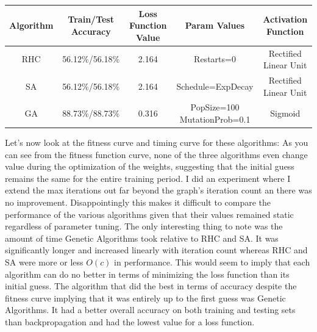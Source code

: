 \documentclass[11pt]{article}
\begin{document}
    \begin{center}
        \begin{tabular}{| c | c | c | c | c |}
            \hline
            Algorithm & Train/Test Accuracy & Loss Function Value & Param Values & Activation Function                 \\
            \hline
            \hline
            RHC       & 56.12\%/56.18\%      & 2.164              & Restarts=0   &        Rectified Linear Unit          \\
            \hline
            SA        & 56.12\%/56.18\%     & 2.164               & Schedule=ExpDecay &    Rectified Linear Unit       \\
            \hline
            GA        & 88.73\%/88.73\%     & 0.316               & PopSize=100 MutationProb=0.1 & Sigmoid\\
            \hline
        \end{tabular}
    \end{center}
    Let's now look at the fitness curve and timing curve for these algorithms:
    As you can see from the fitness function curve, none of the three algorithms even change value during the optimization
    of the weights, suggesting that the initial guess remains the same for the entire training period.
    I did an experiment where I extend the max iterations out far beyond the graph's iteration count an there was no improvement.
    Disappointingly this makes it difficult to compare the performance of the various algorithms given that their values
    remained static regardless of parameter tuning.
    The only interesting thing to note was the amount of time Genetic Algorithms took relative to RHC and SA.
    It was significantly longer and increased linearly with iteration count whereas RHC and SA were more or less $O(c)$ in performance.
    This would seem to imply that each algorithm can do no better in terms of minimizing the loss function than its initial guess.
    The algorithm that did the best in terms of accuracy despite the fitness curve implying that it was entirely up to the first
    guess was Genetic Algorithms.
    It had a better overall accuracy on both training and testing sets than backpropagation and had the lowest value
    for a loss function.
\end{document}
